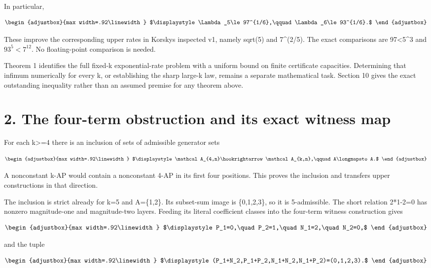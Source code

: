 In particular,

\[
\begin{adjustbox}{max width=.92\linewidth}
$\displaystyle \Lambda_5\le97^{1/6},\qquad \Lambda_6\le93^{1/6}.$
\end{adjustbox}
\]

These improve the corresponding upper rates in Korsky\textquotesingle s inspected v1, namely sqrt(5) and 7\^{}(2/5). The exact comparisons are 97\textless5\^{}3 and \(93^5<7^{12}\). No floating-point comparison is needed.

Theorem 1 identifies the full fixed-k exponential-rate problem with a uniform bound on finite certificate capacities. Determining that infimum numerically for every k, or establishing the sharp large-k law, remains a separate mathematical task. Section 10 gives the exact outstanding inequality rather than an assumed premise for any theorem above.

\section{2. The four-term obstruction and its exact witness map}\label{n02-the-four-term-obstruction-and-its-exact-witness-map}

For each k\textgreater=4 there is an inclusion of sets of admissible generator sets

\[
\begin{adjustbox}{max width=.92\linewidth}
$\displaystyle \mathcal A_{4,n}\hookrightarrow\mathcal A_{k,n},\qquad A\longmapsto A.$
\end{adjustbox}
\]

A nonconstant k-AP would contain a nonconstant 4-AP in its first four positions. This proves the inclusion and transfers upper constructions in that direction.

The inclusion is strict already for k=5 and A=\{1,2\}. Its subset-sum image is \{0,1,2,3\}, so it is 5-admissible. The short relation 2*1-2=0 has nonzero magnitude-one and magnitude-two layers. Feeding its literal coefficient classes into the four-term witness construction gives

\[
\begin{adjustbox}{max width=.92\linewidth}
$\displaystyle P_1=0,\quad P_2=1,\quad N_1=2,\quad N_2=0,$
\end{adjustbox}
\]

and the tuple

\[
\begin{adjustbox}{max width=.92\linewidth}
$\displaystyle (P_1+N_2,P_1+P_2,N_1+N_2,N_1+P_2)=(0,1,2,3).$
\end{adjustbox}
\]

